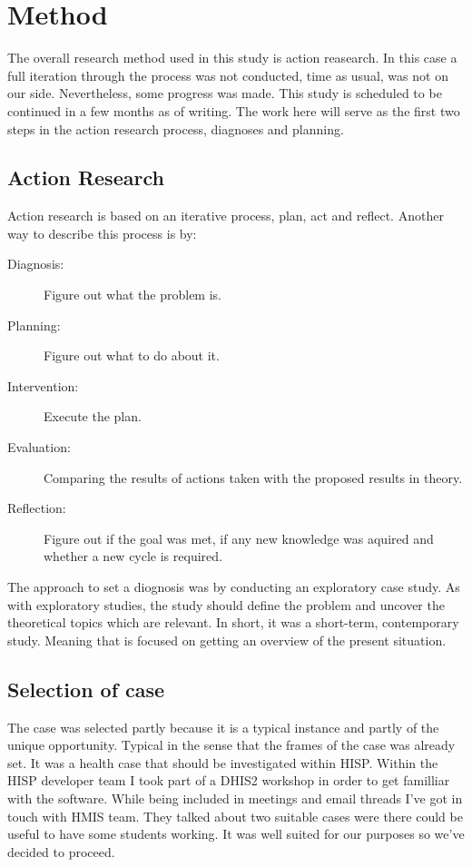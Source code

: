 \chapter{Method}
The overall research method used in this study is action reasearch.
In this case a full iteration through the process was not conducted, time as usual, was not on our side. 
Nevertheless, some progress was made. This study is scheduled to be continued in a few months as of writing.
The work here will serve as the first two steps in the action research process, diagnoses and planning.
\section{Action Research}
Action research is based on an iterative process, plan, act and reflect.
Another way to describe this process is by:
\begin{description}
\item[Diagnosis:] Figure out what the problem is.
\item[Planning:] Figure out what to do about it.
\item[Intervention:] Execute the plan.
\item[Evaluation:] Comparing the results of actions taken with the proposed results in theory.
\item[Reflection:] Figure out if the goal was met, if any new knowledge was aquired and whether a new cycle is required.
\end{description}\cite{13}
The approach to set a diognosis was by conducting an exploratory case study. 
As with exploratory studies, the study should define the problem and uncover the theoretical topics which are relevant.
In short, it was a short-term, contemporary study. Meaning that is focused on getting an overview of the present situation.
\section{Selection of case}
The case was selected partly because it is a typical instance and partly of the unique opportunity.
Typical in the sense that the frames of the case was already set.
It was a health case that should be investigated within HISP. 
Within the HISP developer team I took part of a DHIS2 workshop in order to get familliar with the software.
While being included in meetings and email threads I've got in touch with HMIS team. 
They talked about two suitable cases were there could be useful to have some students working.
It was well suited for our purposes so we've decided to proceed.
